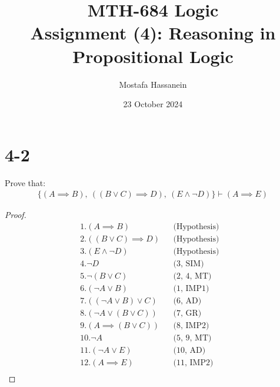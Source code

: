 \documentclass{article}
\author{Mostafa Hassanein}
\title{
  MTH-684 Logic \\
  Assignment (4): Reasoning in Propositional Logic}
\date{23 October 2024}
\begin{document}
\maketitle
\newpage

\section*{4-2}
Prove that:
\begin{align*}
  \{ (A \implies B), \: ((B \lor C) \implies D), \: (E \land \lnot D) \}  \vdash (A \implies E)
\end{align*}

\begin{proof}

  \begin{align*}
    &1. (A \implies B) &&\text{(Hypothesis)} &&\\
    &2. ((B \lor C) \implies D) &&\text{(Hypothesis)} &&\\
    &3. (E \land \lnot D) &&\text{(Hypothesis)} &&\\
    &4. \lnot D &&\text{(3, SIM)} &&\\
    &5. \lnot (B \lor C) &&\text{(2, 4, MT)} &&\\
    &6. (\lnot A \lor B) &&\text{(1, IMP1)} &&\\
    &7. ((\lnot A \lor B) \lor C) &&\text{(6, AD)} &&\\
    &8. (\lnot A \lor (B \lor C)) &&\text{(7, GR)} &&\\
    &9. (A \implies (B \lor C)) &&\text{(8, IMP2)} &&\\
    &10. \lnot A &&\text{(5, 9, MT)} &&\\
    &11. (\lnot A \lor E) &&\text{(10, AD)} &&\\
    &12. (A \implies E) &&\text{(11, IMP2)} &&\\
  \end{align*}

\end{proof}
\end{document}
